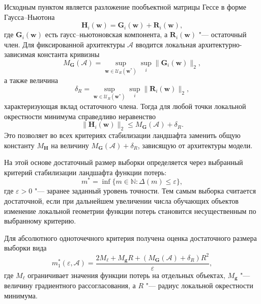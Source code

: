 Исходным пунктом является разложение пообъектной матрицы Гессе в форме Гаусса--Ньютона
\begin{equation}
\mathbf H_i(\mathbf w)=\mathbf G_i(\mathbf w)+\mathbf R_i(\mathbf w),
\end{equation}
где $\mathbf G_i(\mathbf w)$ есть гаусс--ньютоновская компонента, а $\mathbf R_i(\mathbf w)$ "--- остаточный член. Для фиксированной архитектуры $\mathcal A$ вводится локальная архитектурно-зависимая константа кривизны
\begin{equation}
M_{\mathbf G}(\mathcal A)
=
\sup_{\mathbf w\in\mathcal U_R(\mathbf w^*)}
\sup_i
\|\mathbf G_i(\mathbf w)\|_2,
\end{equation}
а также величина
\begin{equation}
\delta_R
=
\sup_{\mathbf w\in\mathcal U_R(\mathbf w^*)}
\sup_i
\|\mathbf R_i(\mathbf w)\|_2,
\end{equation}
характеризующая вклад остаточного члена. Тогда для любой точки локальной окрестности минимума справедливо неравенство
\begin{equation}
\|\mathbf H_i(\mathbf w)\|_2
\le
M_{\mathbf G}(\mathcal A)+\delta_R.
\end{equation}
Это позволяет во всех критериях стабилизации ландшафта заменить общую константу $M_{\mathbf H}$ на величину $M_{\mathbf G}(\mathcal A)+\delta_R$, зависящую от архитектуры модели.

На этой основе достаточный размер выборки определяется через выбранный критерий стабилизации ландшафта функции потерь:
\begin{equation}
m^*
=
\inf\{m\in\mathbb N:\Delta(m)\le\varepsilon\},
\end{equation}
где $\varepsilon>0$ "--- заранее заданный уровень точности. Тем самым выборка считается достаточной, если при дальнейшем увеличении числа обучающих объектов изменение локальной геометрии функции потерь становится несущественным по выбранному критерию.

Для абсолютного одноточечного критерия получена оценка достаточного размера выборки вида
\begin{equation}
m_1^*(\varepsilon, \mathcal A)
=
\frac{
2M_{\ell}
+
M_{\mathbf g}R
+
\left(M_{\mathbf G}(\mathcal A)+\delta_R\right)R^2
}{\varepsilon},
\end{equation}
где $M_{\ell}$ ограничивает значения функции потерь на отдельных объектах, $M_{\mathbf g}$ "--- величину градиентного рассогласования, а $R$ "--- радиус локальной окрестности минимума.

